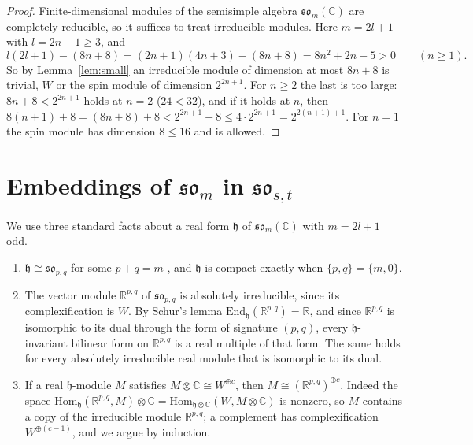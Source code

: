 \documentclass[11pt]{amsart}
\theoremstyle{remark}
\newcommand{\so}{\mathfrak{so}}
\newcommand{\h}{\mathfrak{h}}
\newcommand{\R}{\mathbb{R}}
\newcommand{\C}{\mathbb{C}}
\begin{document}
\begin{proof}
Finite-dimensional modules of the semisimple algebra $\so_m(\C)$ are completely reducible, so it suffices to treat irreducible modules. Here $m=2l+1$ with $l=2n+1\ge3$, and
\[
l(2l+1)-(8n+8)=(2n+1)(4n+3)-(8n+8)=8n^2+2n-5>0\qquad(n\ge1).
\]
So by Lemma~\ref{lem:small} an irreducible module of dimension at most $8n+8$ is trivial, $W$ or the spin module of dimension $2^{2n+1}$. For $n\ge2$ the last is too large: $8n+8<2^{2n+1}$ holds at $n=2$ ($24<32$), and if it holds at $n$, then $8(n+1)+8=(8n+8)+8<2^{2n+1}+8\le 4\cdot2^{2n+1}=2^{2(n+1)+1}$. For $n=1$ the spin module has dimension $8\le16$ and is allowed.
\end{proof}
\section{Embeddings of \texorpdfstring{$\so_m$}{so(m)} in \texorpdfstring{$\so_{s,t}$}{so(s,t)}}\label{sec:embed}

We use three standard facts about a real form $\h$ of $\so_m(\C)$ with $m=2l+1$ odd.
\begin{enumerate}
\item[(F1)] $\h\cong\so_{p,q}$ for some $p+q=m$ \cite[Ch.~X]{Hel78}, and $\h$ is compact exactly when $\{p,q\}=\{m,0\}$.
\item[(F2)] The vector module $\R^{p,q}$ of $\so_{p,q}$ is absolutely irreducible, since its complexification is $W$. By Schur's lemma $\mathrm{End}_\h(\R^{p,q})=\R$, and since $\R^{p,q}$ is isomorphic to its dual through the form of signature $(p,q)$, every $\h$-invariant bilinear form on $\R^{p,q}$ is a real multiple of that form. The same holds for every absolutely irreducible real module that is isomorphic to its dual.
\item[(F3)] If a real $\h$-module $M$ satisfies $M\otimes\C\cong W^{\oplus c}$, then $M\cong(\R^{p,q})^{\oplus c}$. Indeed the space $\mathrm{Hom}_\h(\R^{p,q},M)\otimes\C=\mathrm{Hom}_{\h\otimes\C}(W,M\otimes\C)$ is nonzero, so $M$ contains a copy of the irreducible module $\R^{p,q}$; a complement has complexification $W^{\oplus(c-1)}$, and we argue by induction.
\end{enumerate}
\end{document}
